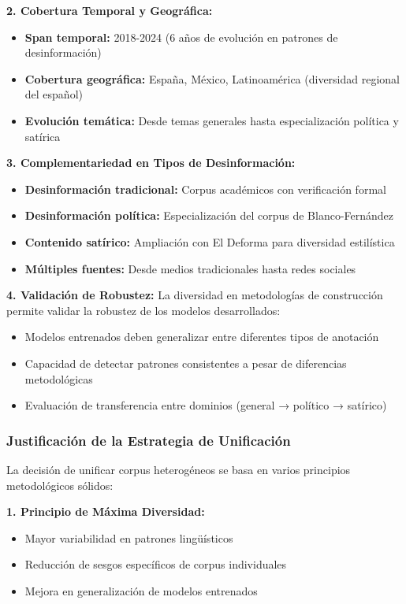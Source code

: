 \textbf{2. Cobertura Temporal y Geográfica:}
\begin{itemize}
    \item \textbf{Span temporal:} 2018-2024 (6 años de evolución en patrones de desinformación)
    \item \textbf{Cobertura geográfica:} España, México, Latinoamérica (diversidad regional del español)
    \item \textbf{Evolución temática:} Desde temas generales hasta especialización política y satírica
\end{itemize}

\textbf{3. Complementariedad en Tipos de Desinformación:}
\begin{itemize}
    \item \textbf{Desinformación tradicional:} Corpus académicos con verificación formal
    \item \textbf{Desinformación política:} Especialización del corpus de Blanco-Fernández
    \item \textbf{Contenido satírico:} Ampliación con El Deforma para diversidad estilística
    \item \textbf{Múltiples fuentes:} Desde medios tradicionales hasta redes sociales
\end{itemize}

\textbf{4. Validación de Robustez:}
La diversidad en metodologías de construcción permite validar la robustez de los modelos desarrollados:
\begin{itemize}
    \item Modelos entrenados deben generalizar entre diferentes tipos de anotación
    \item Capacidad de detectar patrones consistentes a pesar de diferencias metodológicas
    \item Evaluación de transferencia entre dominios (general → político → satírico)
\end{itemize}

\subsubsection{Justificación de la Estrategia de Unificación}

La decisión de unificar corpus heterogéneos se basa en varios principios metodológicos sólidos:

\textbf{1. Principio de Máxima Diversidad:}
\begin{itemize}
    \item Mayor variabilidad en patrones lingüísticos
    \item Reducción de sesgos específicos de corpus individuales
    \item Mejora en generalización de modelos entrenados
\end{itemize}

